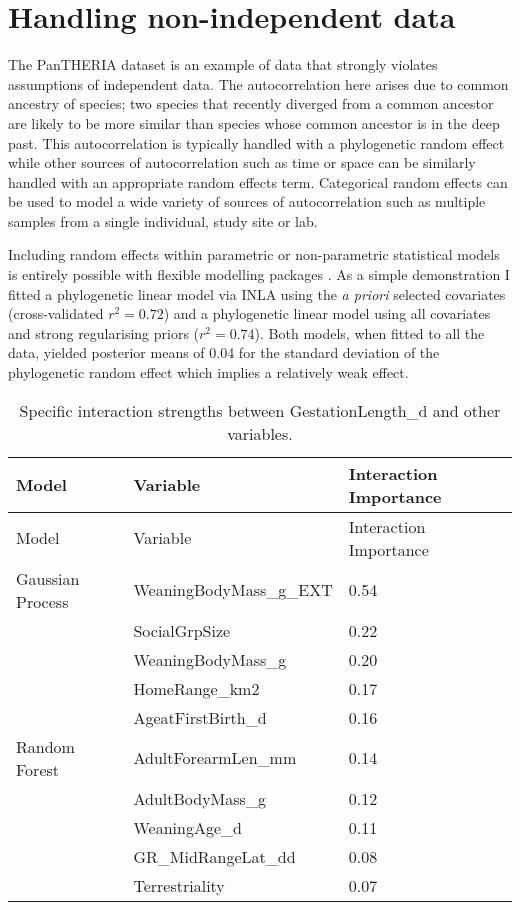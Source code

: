 \documentclass[10pt,]{article}
\begin{document}
\section{Handling non-independent data}\label{handling-non-independent-data}

The PanTHERIA dataset is an example of data that strongly violates assumptions of independent data.
The autocorrelation here arises due to common ancestry of species; two species that recently diverged from a common ancestor are likely to be more similar than species whose common ancestor is in the deep past.
This autocorrelation is typically handled with a phylogenetic random effect while other sources of autocorrelation such as time or space can be similarly handled with an appropriate random effects term.
Categorical random effects can be used to model a wide variety of sources of autocorrelation such as multiple samples from a single individual, study site or lab.

Including random effects within parametric or non-parametric statistical models is entirely possible with flexible modelling packages \citep{stan, INLA, glmmTMB, tmb}.
As a simple demonstration I fitted a phylogenetic linear model via INLA \citep{INLA} using the \emph{a priori} selected covariates (cross-validated \(r^2 = 0.72\)) and a phylogenetic linear model using all covariates and strong regularising priors (\(r^2 = 0.74\)).
Both models, when fitted to all the data, yielded posterior means of 0.04 for the standard deviation of the phylogenetic random effect which implies a relatively weak effect.

\begin{table}[t!]
\begin{longtable}[c]{@{}lll@{}}
\caption{Specific interaction strengths between GestationLength\_d and other variables. \label{tbl:specificinter}}\tabularnewline
\toprule
Model & Variable & Interaction Importance\tabularnewline
\midrule
\endfirsthead
\toprule
Model & Variable & Interaction Importance\tabularnewline
\midrule
\endhead
Gaussian Process & WeaningBodyMass\_g\_EXT & 0.54\tabularnewline
& SocialGrpSize & 0.22\tabularnewline
& WeaningBodyMass\_g & 0.20\tabularnewline
& HomeRange\_km2 & 0.17\tabularnewline
& AgeatFirstBirth\_d & 0.16\tabularnewline
Random Forest & AdultForearmLen\_mm & 0.14\tabularnewline
& AdultBodyMass\_g & 0.12\tabularnewline
& WeaningAge\_d & 0.11\tabularnewline
& GR\_MidRangeLat\_dd & 0.08\tabularnewline
& Terrestriality & 0.07\tabularnewline
\bottomrule
\end{longtable}
\end{table}
  
\end{document}
